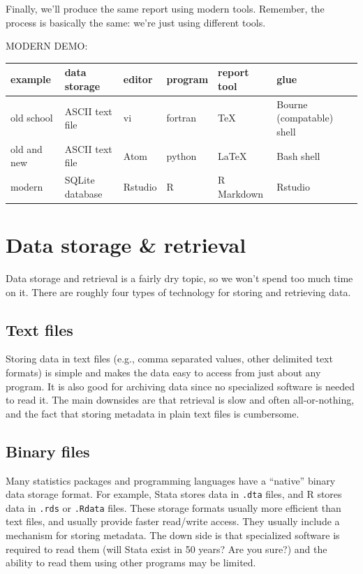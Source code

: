 \documentclass[]{book}
\begin{document}
Finally, we'll produce the same report using modern tools. Remember, the process is basically the same: we're just using different tools.

MODERN DEMO:

\begin{longtable}[]{@{}llllll@{}}
\toprule
example & data storage & editor & program & report tool & glue\tabularnewline
\midrule
\endhead
old school & ASCII text file & vi & fortran & TeX & Bourne (compatable) shell\tabularnewline
old and new & ASCII text file & Atom & python & LaTeX & Bash shell\tabularnewline
modern & SQLite database & Rstudio & R & R Markdown & Rstudio\tabularnewline
\bottomrule
\end{longtable}

\hypertarget{data-storage-retrieval}{%
\section{Data storage \& retrieval}\label{data-storage-retrieval}}

Data storage and retrieval is a fairly dry topic, so we won't spend too much time on it. There are roughly four types of technology for storing and retrieving data.

\hypertarget{text-files}{%
\subsection{Text files}\label{text-files}}

Storing data in text files (e.g., comma separated values, other delimited text formats) is simple and makes the data easy to access from just about any program. It is also good for archiving data since no specialized software is needed to read it. The main downsides are that retrieval is slow and often all-or-nothing, and the fact that storing metadata in plain text files is cumbersome.

\hypertarget{binary-files}{%
\subsection{Binary files}\label{binary-files}}

Many statistics packages and programming languages have a ``native'' binary data storage format. For example, Stata stores data in \texttt{.dta} files, and R stores data in \texttt{.rds} or \texttt{.Rdata} files. These storage formats usually more efficient than text files, and usually provide faster read/write access. They usually include a mechanism for storing metadata. The down side is that specialized software is required to read them (will Stata exist in 50 years? Are you sure?) and the ability to read them using other programs may be limited.
\end{document}
